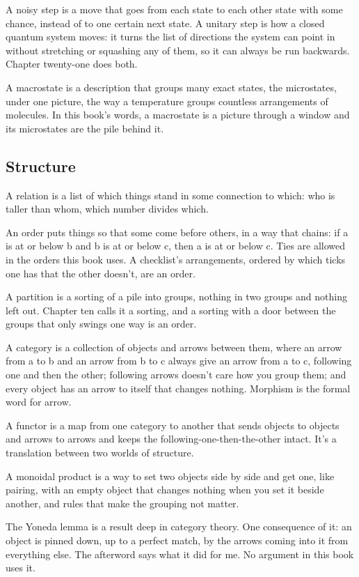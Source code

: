\documentclass[11pt,twoside]{article}
\theoremstyle{thielethm}
\theoremstyle{thieledef}
\theoremstyle{thieledef}
\theoremstyle{thieledef}
\theoremstyle{thielethm}
\theoremstyle{thieleobs}
\theoremstyle{thielethm}
\begin{document}
A noisy step is a move that goes from each state to each other state with some chance, instead of to one certain next state. A unitary step is how a closed quantum system moves: it turns the list of directions the system can point in without stretching or squashing any of them, so it can always be run backwards. Chapter twenty-one does both.

A macrostate is a description that groups many exact states, the microstates, under one picture, the way a temperature groups countless arrangements of molecules. In this book's words, a macrostate is a picture through a window and its microstates are the pile behind it.

\subsection{Structure}

A relation is a list of which things stand in some connection to which: who is taller than whom, which number divides which.

An order puts things so that some come before others, in a way that chains: if a is at or below b and b is at or below c, then a is at or below c. Ties are allowed in the orders this book uses. A checklist's arrangements, ordered by which ticks one has that the other doesn't, are an order.

A partition is a sorting of a pile into groups, nothing in two groups and nothing left out. Chapter ten calls it a sorting, and a sorting with a door between the groups that only swings one way is an order.

A category is a collection of objects and arrows between them, where an arrow from a to b and an arrow from b to c always give an arrow from a to c, following one and then the other; following arrows doesn't care how you group them; and every object has an arrow to itself that changes nothing. Morphism is the formal word for arrow.

A functor is a map from one category to another that sends objects to objects and arrows to arrows and keeps the following-one-then-the-other intact. It's a translation between two worlds of structure.

A monoidal product is a way to set two objects side by side and get one, like pairing, with an empty object that changes nothing when you set it beside another, and rules that make the grouping not matter.

The Yoneda lemma is a result deep in category theory. One consequence of it: an object is pinned down, up to a perfect match, by the arrows coming into it from everything else. The afterword says what it did for me. No argument in this book uses it.
\end{document}
